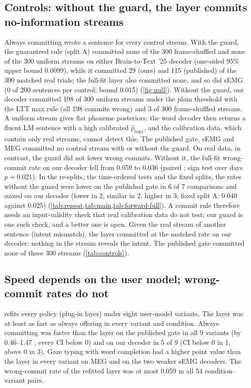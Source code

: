\subsection{Controls: without the guard, the layer commits no-information streams}
\label{sec:res-null}
Always committing wrote a sentence for every control stream. With the guard, the guaranteed rule (split A) committed none of the 300 frame-shuffled and none of the 300 uniform streams on either Brain-to-Text '25 decoder (one-sided 95\% upper bound 0.0099), while it committed 29 (ours) and 115 (published) of the 300 matched real trials; the full-fit layer also committed none, and so did sEMG (0 of 200 sentences per control; bound 0.015) (\cref{fig:null}). Without the guard, our decoder committed 198 of 300 uniform streams under the plain threshold with the LTT max rule (all 198 commits wrong) and 3 of 300 frame-shuffled streams. A uniform stream gives flat phoneme posteriors; the word decoder then returns a fluent LM sentence with a high calibrated $\hat p_{\mathrm{top1}}$, and the calibration data, which contain only real streams, cannot detect this. The published gate, sEMG and MEG committed no control stream with or without the guard. On real data, in contrast, the guard did not lower wrong commits. Without it, the full-fit wrong-commit rate on our decoder fell from 0.059 to 0.036 (paired ; sign test over days $p = 0.021$). In the re-splits, the time-ordered tests and the fixed splits, the rates without the guard were lower on the published gate in 6 of 7 comparisons and mixed on our decoder (lower in 2, similar in 2, higher in 3; fixed split A: 0.040 against 0.025) (\cref{tab:repeat,tab:main,tab:forward-full}). A commit rule therefore needs an input-validity check that real calibration data do not test; our guard is one such check, and a better one is open. Given the real stream of another sentence (intent mismatch), the layer committed at the matched rate on our decoder: nothing in the stream reveals the intent. The published gate committed none of these 300 streams (\cref{tab:controls}).

\subsection{Speed depends on the user model; wrong-commit rates do not}
\label{sec:res-user}
 refits every policy (plug-in layer) under eight user-model variants. The layer was at least as fast as always offering in every variant and condition. Always committing was faster than the layer on the published gate in all 9 variants (by 0.46--1.47 \ewpm{}, every CI below 0) and on our decoder in 5 of 9 (CI below 0 in 1, above 0 in 3). Gaze typing with word completion had a higher point value than the layer in every variant on MEG and on the two weaker sEMG decoders. The wrong-commit rate of the refitted layer was at most 0.059 in all 54 condition--variant pairs.

